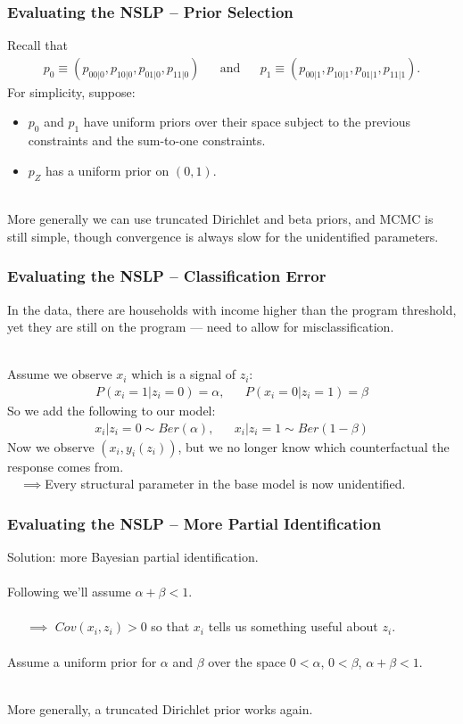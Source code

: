 \documentclass[xcolor=dvipsnames]{beamer}
\begin{document}
\begin{frame}
\frametitle{Evaluating the NSLP -- Prior Selection}
Recall that
\begin{align*}
p_0 \equiv (p_{00|0}, p_{10|0}, p_{01|0}, p_{11|0}) &&\mbox{and}&&p_1 \equiv (p_{00|1}, p_{10|1}, p_{01|1}, p_{11|1}).
\end{align*}
For simplicity, suppose: 
\begin{itemize}
\item $p_0$ and $p_1$ have uniform priors over their space subject to the previous constraints and the sum-to-one constraints. 
\item $p_Z$ has a uniform prior on $(0,1)$.\\~
\end{itemize}

\pause More generally we can use truncated Dirichlet and beta priors, and MCMC is still simple, though convergence is always slow for the unidentified parameters.
\end{frame}

\begin{frame}
  \frametitle{Evaluating the NSLP -- Classification Error}
In the data, there are households with income higher than the program threshold, yet they are still on the program --- need to allow for misclassification.\\~

\pause Assume we observe $x_i$ which is a signal of $z_i$:
\begin{align*}
  P(x_i=1|z_i=0)=\alpha, &&  P(x_i=0|z_i=1)=\beta
\end{align*}
\pause So we add the following to our model:
\begin{align*}
  x_i|z_i=0 \sim Ber(\alpha),&&  x_i|z_i=1 \sim Ber(1-\beta)
\end{align*}
\pause Now we observe $(x_i,y_i(z_i))$, but we no longer know which counterfactual the response comes from.\\ 
\ \ $\implies$Every structural parameter in the base model is now unidentified. 
\end{frame}

\begin{frame}
  \frametitle{Evaluating the NSLP -- More Partial Identification}
Solution: more Bayesian partial identification. \\~\\

\pause Following \cite{bollinger2009bayesian} we'll assume $\alpha + \beta <1$.\\~\\

\ \ \ $\implies$ $Cov(x_i,z_i)>0$ so that $x_i$ tells us something useful about $z_i$.\\~\\

\pause Assume a uniform prior for $\alpha$ and $\beta$ over the space $0<\alpha$, $0<\beta$, $\alpha + \beta < 1$.\\~

\pause More generally, a truncated Dirichlet prior works again.
\end{frame}
\end{document}

